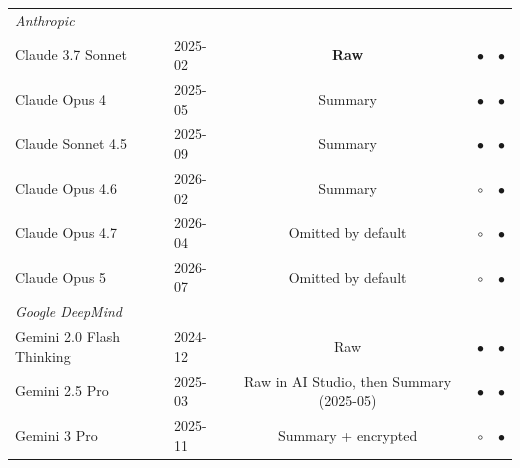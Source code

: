 \documentclass[manuscript,review,anonymous]{acmart}
\begin{document}
\begin{table}[H]
\begin{tabular}{llccc}
\multicolumn{5}{l}{\textit{Anthropic}~\cite{anthropic2025extended,anthropic2025claude4,anthropic2025extendeddocs,anthropic2026thinking}} \\
\quad Claude 3.7 Sonnet     & 2025-02 & \textbf{Raw}        & $\bullet$ & $\bullet$ \\
\quad Claude Opus 4         & 2025-05 & Summary             & $\bullet$ & $\bullet$ \\
\quad Claude Sonnet 4.5     & 2025-09 & Summary             & $\bullet$ & $\bullet$ \\
\quad Claude Opus 4.6       & 2026-02 & Summary             & $\circ$   & $\bullet$ \\
\quad Claude Opus 4.7       & 2026-04 & Omitted by default  & $\circ$   & $\bullet$ \\
\quad Claude Opus 5         & 2026-07 & Omitted by default  & $\circ$   & $\bullet$ \\
\multicolumn{5}{l}{\textit{Google DeepMind}~\cite{google2024thinkingmode,google2025thinkingapr,google2025thoughtsummaries,google2025thinkingnov,google2025thinking}} \\
\quad Gemini 2.0 Flash Thinking & 2024-12 & Raw & $\bullet$ & $\bullet$ \\
\quad Gemini 2.5 Pro        & 2025-03 & Raw in AI Studio, then Summary (2025-05) & $\bullet$ & $\bullet$ \\
\quad Gemini 3 Pro          & 2025-11 & Summary + encrypted & $\circ$   & $\bullet$ \\

\end{tabular}
\end{table}
\end{document}
